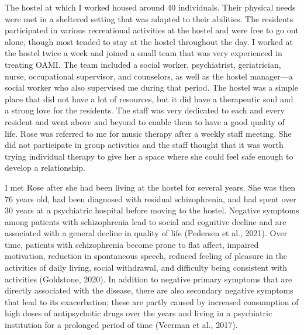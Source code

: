 \documentclass[authordate, empirical]{jote-new-article}
\begin{document}
The hostel at which I worked housed around 40 individuals. Their physical needs were met in a sheltered setting that was adapted to their abilities. The residents participated in various recreational activities at the hostel and were free to go out alone, though most tended to stay at the hostel throughout the day. I worked at the hostel twice a week and joined a small team that was very experienced in treating OAMI. The team included a social worker, psychiatrist, geriatrician, nurse, occupational supervisor, and counselors, as well as the hostel manager—a social worker who also supervised me during that period. The hostel was a simple place that did not have a lot of resources, but it did have a therapeutic soul and a strong love for the residents. The staff was very dedicated to each and every resident and went above and beyond to enable them to have a good quality of life. Rose was referred to me for music therapy after a weekly staff meeting. She did not participate in group activities and the staff thought that it was worth trying individual therapy to give her a space where she could feel safe enough to develop a relationship.



I met Rose after she had been living at the hostel for several years. She was then 76 years old, had been diagnosed with residual schizophrenia, and had spent over 30 years at a psychiatric hospital before moving to the hostel. Negative symptoms among patients with schizophrenia lead to social and cognitive decline and are associated with a general decline in quality of life (Pedersen et al., 2021). Over time, patients with schizophrenia become prone to flat affect, impaired motivation, reduction in spontaneous speech, reduced feeling of pleasure in the activities of daily living, social withdrawal, and difficulty being consistent with activities (Goldstone, 2020). In addition to negative primary symptoms that are directly associated with the disease, there are also secondary negative symptoms that lead to its exacerbation; these are partly caused by increased consumption of high doses of antipsychotic drugs over the years and living in a psychiatric institution for a prolonged period of time (Veerman et al., 2017).
\end{document}
